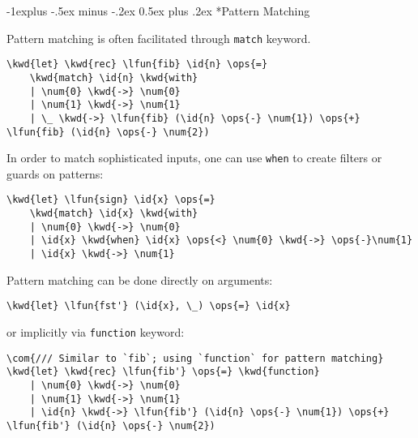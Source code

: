 \documentclass[10pt,landscape]{article}
\makeatletter
\renewcommand{\subsection}{\@startsection{subsection}{2}{0mm}%
                                {-1explus -.5ex minus -.2ex}%
                                {0.5ex plus .2ex}%
                                {\normalfont\normalsize\bfseries}}
\newcommand{\id}[1]{\textcolor[HTML]{000000}{#1}}
\newcommand{\kwd}[1]{\textcolor[HTML]{0000FF}{#1}}
\newcommand{\com}[1]{\textcolor[HTML]{008000}{#1}}
\newcommand{\ops}[1]{\textcolor[HTML]{000000}{#1}}
\newcommand{\num}[1]{\textcolor[HTML]{000000}{#1}}
\newcommand{\lfun}[1]{\textcolor[HTML]{0000A0}{#1}}
\makeatother
\begin{document}
\begin{multicols}{3}
\begin{Verbatim}[commandchars=\\\{\}]
\end{Verbatim}

\subsection*{Pattern Matching}



Pattern matching is often facilitated through \texttt{match} keyword.
\begin{Verbatim}[commandchars=\\\{\}]
\kwd{let} \kwd{rec} \lfun{fib} \id{n} \ops{=}
    \kwd{match} \id{n} \kwd{with}
    | \num{0} \kwd{->} \num{0}
    | \num{1} \kwd{->} \num{1}
    | \_ \kwd{->} \lfun{fib} (\id{n} \ops{-} \num{1}) \ops{+} \lfun{fib} (\id{n} \ops{-} \num{2})

\end{Verbatim}



In order to match sophisticated inputs, one can use \texttt{when} to create filters or guards on patterns:
\begin{Verbatim}[commandchars=\\\{\}]
\kwd{let} \lfun{sign} \id{x} \ops{=} 
    \kwd{match} \id{x} \kwd{with}
    | \num{0} \kwd{->} \num{0}
    | \id{x} \kwd{when} \id{x} \ops{<} \num{0} \kwd{->} \ops{-}\num{1}
    | \id{x} \kwd{->} \num{1}

\end{Verbatim}



Pattern matching can be done directly on arguments:
\begin{Verbatim}[commandchars=\\\{\}]
\kwd{let} \lfun{fst'} (\id{x}, \_) \ops{=} \id{x}

\end{Verbatim}



or implicitly via \texttt{function} keyword:
\begin{Verbatim}[commandchars=\\\{\}]
\com{/// Similar to `fib`; using `function` for pattern matching}
\kwd{let} \kwd{rec} \lfun{fib'} \ops{=} \kwd{function}
    | \num{0} \kwd{->} \num{0}
    | \num{1} \kwd{->} \num{1}
    | \id{n} \kwd{->} \lfun{fib'} (\id{n} \ops{-} \num{1}) \ops{+} \lfun{fib'} (\id{n} \ops{-} \num{2})

\end{Verbatim}




\end{multicols}
\end{document}
